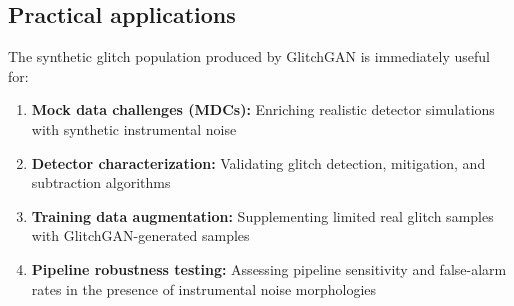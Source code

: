 \documentclass[reprint,nofootinbib,amsmath,amssymb,aps,floatfix]{revtex4-2}
\begin{document}






\subsection{Practical applications}

The synthetic glitch population produced by GlitchGAN is immediately useful for:

\begin{enumerate}
\item
\textbf{Mock data challenges (MDCs):} Enriching realistic detector simulations with synthetic instrumental noise

\item
\textbf{Detector characterization:} Validating glitch detection, mitigation, and subtraction algorithms

\item
\textbf{Training data augmentation:} Supplementing limited real glitch samples with GlitchGAN-generated samples

\item
\textbf{Pipeline robustness testing:} Assessing pipeline sensitivity and false-alarm rates in the presence of instrumental noise morphologies
\end{enumerate}
\end{document}
